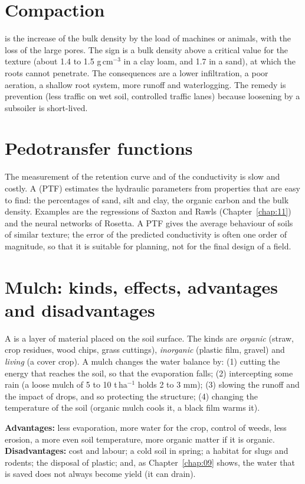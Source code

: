 \section{Compaction}
 is the increase of the bulk density by the load of machines or animals, with the loss of the large pores. The sign is a bulk density above a critical value for the texture (about 1.4 to 1.5 g\,cm$^{-3}$ in a clay loam, and 1.7 in a sand), at which the roots cannot penetrate. The consequences are a lower infiltration, a poor aeration, a shallow root system, more runoff and waterlogging. The remedy is prevention (less traffic on wet soil, controlled traffic lanes) because loosening by a subsoiler is short-lived.

\section{Pedotransfer functions}
The measurement of the retention curve and of the conductivity is slow and costly. A  (PTF) estimates the hydraulic parameters from properties that are easy to find: the percentages of sand, silt and clay, the organic carbon and the bulk density. Examples are the regressions of Saxton and Rawls (Chapter~\ref{chap:11}) and the neural networks of Rosetta. A PTF gives the average behaviour of soils of similar texture; the error of the predicted conductivity is often one order of magnitude, so that it is suitable for planning, not for the final design of a field.

\section{Mulch: kinds, effects, advantages and disadvantages}
A  is a layer of material placed on the soil surface. The kinds are \emph{organic} (straw, crop residues, wood chips, grass cuttings), \emph{inorganic} (plastic film, gravel) and \emph{living} (a cover crop). A mulch changes the water balance by: (1) cutting the energy that reaches the soil, so that the evaporation falls; (2) intercepting some rain (a loose mulch of 5 to 10 t\,ha$^{-1}$ holds 2 to 3 mm); (3) slowing the runoff and the impact of drops, and so protecting the structure; (4) changing the temperature of the soil (organic mulch cools it, a black film warms it).
\par\noindent \textbf{Advantages:} less evaporation, more water for the crop, control of weeds, less erosion, a more even soil temperature, more organic matter if it is organic. \textbf{Disadvantages:} cost and labour; a cold soil in spring; a habitat for slugs and rodents; the disposal of plastic; and, as Chapter~\ref{chap:09} shows, the water that is saved does not always become yield (it can drain).

